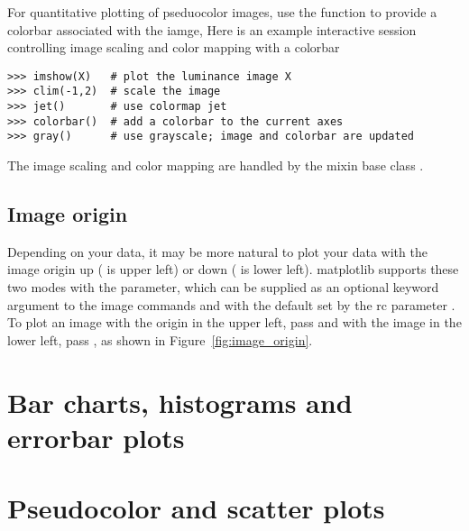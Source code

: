 \documentclass[]{book}
\begin{document}
For quantitative plotting of pseduocolor images, use the
 function to provide a colorbar associated with the
iamge, Here is an example interactive session controlling image
scaling and color mapping with a colorbar

\begin{lstlisting}
>>> imshow(X)   # plot the luminance image X
>>> clim(-1,2)  # scale the image
>>> jet()       # use colormap jet
>>> colorbar()  # add a colorbar to the current axes
>>> gray()      # use grayscale; image and colorbar are updated
\end{lstlisting}

The image scaling and color mapping are handled by the mixin base
class .

\subsection{Image origin}
\label{sec:image_origin}

Depending on your data, it may be more natural to plot your data with
the image origin up ( is upper left) or down
( is lower left).  matplotlib supports these two modes
with the  parameter, which can be supplied as an optional
keyword argument to the image commands  and
 with the default set by the rc parameter
.  To plot an image with the origin in the upper
left, pass  and with the image in the lower left,
pass , as shown in Figure~\ref{fig:image_origin}.








\section{Bar charts, histograms and errorbar plots}
\label{sec:barcharts}

\section{Pseudocolor and scatter plots}
\label{sec:pcolor_scatter}
\end{document}
